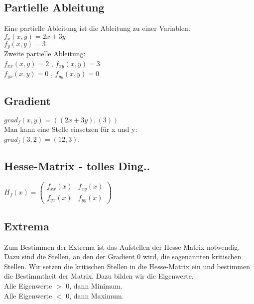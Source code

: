 \documentclass[a4paper,landscape, 11pt]{article}
\begin{document}
\begin{multicols}{4}
\begin{small}
       \subsection{Partielle Ableitung}
       Eine partielle Ableitung ist die Ableitung zu einer Variablen.\\
       $f_x(x,y) = 2x + 3y$ \\
       $f_y(x,y) = 3$ \\
       Zweite partielle Ableitung: \\
       $f_{xx}(x,y) = 2$ , 
       $f_{xy}(x,y) = 3$ \\
       $f_{yx}(x,y) = 0$ ,
       $f_{yy}(x,y) = 0$ 
       \subsection{Gradient}
       $grad_f(x,y) = ((2x + 3y), (3))$ \\
       Man kann eine Stelle einsetzen für x und y:\\
       $grad_f(3,2)= (12, 3)$.
       
       \subsection{Hesse-Matrix - tolles Ding..}
       $H_f(x) = \left( 
       \begin{matrix}
       f_{xx}(x) & f_{xy}(x) \\
       f_{yx}(x) & f_{yy}(x)
       \end{matrix}
       \right)
       $
       
       \subsection{Extrema}
       Zum Bestimmen der Extrema ist das Aufstellen der Hesse-Matrix notwendig.
       Dazu sind die Stellen, an den der Gradient 0 wird, die sogenannten kritischen Stellen. Wir setzen die kritischen Stellen in die Hesse-Matrix ein und bestimmen die Bestimmtheit der Matrix. Dazu bilden wir die Eigenwerte. \\
       Alle Eigenwerte $>$ 0, dann Minimum.\\
       Alle Eigenwerte $<$ 0, dann Maximum.

\end{small}
\end{multicols}
\end{document}
